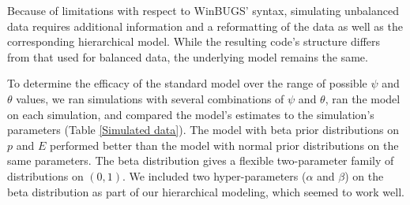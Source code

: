 \documentclass[12pt]{article}
\begin{document}
    Because of limitations with respect to WinBUGS' syntax, simulating
    unbalanced data requires additional information and a reformatting
    of the data as well as the corresponding hierarchical model. While the
    resulting code's structure differs from that used for balanced
    data, the underlying model remains the same.

    To determine the efficacy of the standard model over the range of possible
    \(\psi\) and \(\theta\) values, we ran simulations with several combinations
    of \(\psi\) and \(\theta\), ran the model on each simulation, and compared
    the model's estimates to the simulation's parameters (Table \ref{Simulated
    data}). The model with beta
    prior distributions on \(p\) and \(E\) performed better than the model with
    normal prior distributions on the same parameters. The beta distribution
    gives a flexible two-parameter family of distributions on \((0,1)\). We
    included two hyper-parameters (\(\alpha\) and \(\beta\)) on the beta
    distribution as part of our hierarchical modeling, which seemed to work
    well.
\end{document}
